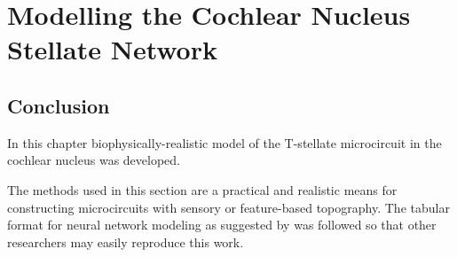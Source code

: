 \documentclass[11pt,a4paper,titlepage,twoside,openright]{book}
\begin{document}

\setcounter{chapter}{2}
\chapter[Simple Responses]{Modelling the Cochlear Nucleus Stellate Network}
\label{sec:SimpleResponsesChapter}



\newpage

\newpage

\newpage

% 
\newpage


\section{Conclusion}

In this chapter biophysically-realistic model of the
T-stellate microcircuit in the cochlear nucleus was developed.


The methods used in this section are a practical and realistic means
for constructing microcircuits with sensory or feature-based
topography.  The tabular format for neural network modeling as
suggested by \citet{NordlieGewaltigEtAl:2009} was followed so that other
researchers may easily reproduce this work. 


\appendix


 

\newpage
\listoftodos
\end{document}
